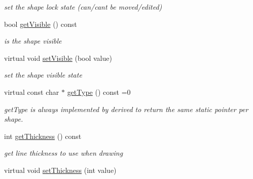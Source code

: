 \begin{DoxyCompactItemize}
\begin{DoxyCompactList}\small\item\em set the shape lock state (can/can\textquotesingle{}t be moved/edited) \end{DoxyCompactList}\item 
bool \hyperlink{classcanvascv_1_1Shape_aab29458fc2f7173a2822243f5c5f102e}{get\+Visible} () const \hypertarget{classcanvascv_1_1Shape_aab29458fc2f7173a2822243f5c5f102e}{}\label{classcanvascv_1_1Shape_aab29458fc2f7173a2822243f5c5f102e}

\begin{DoxyCompactList}\small\item\em is the shape visible \end{DoxyCompactList}\item 
virtual void \hyperlink{classcanvascv_1_1Shape_ae35177d229d3e67a39043f82a73fda6a}{set\+Visible} (bool value)\hypertarget{classcanvascv_1_1Shape_ae35177d229d3e67a39043f82a73fda6a}{}\label{classcanvascv_1_1Shape_ae35177d229d3e67a39043f82a73fda6a}

\begin{DoxyCompactList}\small\item\em set the shape visible state \end{DoxyCompactList}\item 
virtual const char $\ast$ \hyperlink{classcanvascv_1_1Shape_adee3cc696c7e82b0d2946e7e667ddd46}{get\+Type} () const =0
\begin{DoxyCompactList}\small\item\em get\+Type is always implemented by derived to return the same static pointer per shape. \end{DoxyCompactList}\item 
int \hyperlink{classcanvascv_1_1Shape_a58991b0f8c38c5ca9a0dabac9a95b8c0}{get\+Thickness} () const \hypertarget{classcanvascv_1_1Shape_a58991b0f8c38c5ca9a0dabac9a95b8c0}{}\label{classcanvascv_1_1Shape_a58991b0f8c38c5ca9a0dabac9a95b8c0}

\begin{DoxyCompactList}\small\item\em get line thickness to use when drawing \end{DoxyCompactList}\item 
virtual void \hyperlink{classcanvascv_1_1Shape_a67c1ccb98b4d24735e368ebbd03fb76d}{set\+Thickness} (int value)\hypertarget{classcanvascv_1_1Shape_a67c1ccb98b4d24735e368ebbd03fb76d}{}\label{classcanvascv_1_1Shape_a67c1ccb98b4d24735e368ebbd03fb76d}


\end{DoxyCompactItemize}
